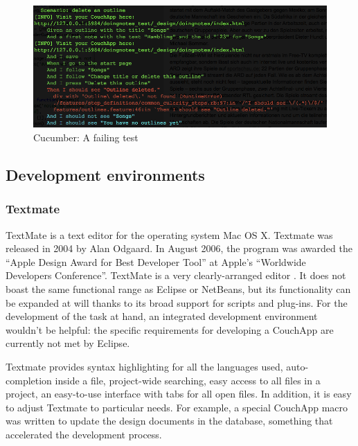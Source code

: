 \medskip
\begin{figure}[ht] 
  \begin{center}
    \includegraphics[width=\textwidth]{grafik/cucumber-example-bad} 
  \end{center}
  \caption{Cucumber: A failing test}
  \label{fig:cucumber-bad} 
\end{figure}




\subsection{Development environments}

\subsubsection{Textmate}

TextMate \cite{textmate:website} is a text editor for the operating system Mac OS X. Textmate was released in 2004 by Alan Odgaard. In August 2006, the program was awarded the \enquote{Apple Design Award for Best Developer Tool} at Apple's \enquote{Worldwide Developers Conference}. TextMate is a very clearly-arranged editor . It does not boast the same functional range as Eclipse or NetBeans, but its functionality can be expanded at will thanks to its broad support for scripts and plug-ins. For the development of the task at hand, an integrated development environment wouldn't be helpful: the specific requirements for developing a CouchApp are currently not met by Eclipse.

Textmate provides syntax highlighting for all the languages used, auto-completion inside a file, project-wide searching, easy access to all files in a project, an easy-to-use interface with tabs for all open files. In addition, it is easy to adjust Textmate to particular needs. For example, a special CouchApp macro was written to update the design documents in the database, something that accelerated the development process.

